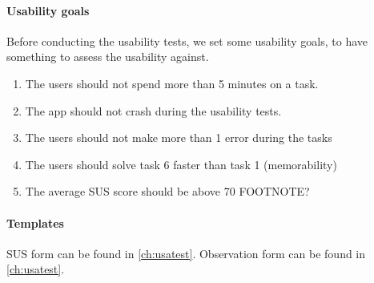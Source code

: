 		\paragraph{Usability goals}\hfill
\newline
		Before conducting the usability tests, we set some usability goals, to have something to assess the usability against.
		\begin{enumerate}
			\item{}The users should not spend more than 5 minutes on a task.
			\item{}The app should not crash during the usability tests.
			\item{}The users should not make more than 1 error during the tasks
			\item{}The users should solve task 6 faster than task 1 (memorability)
			\item{}The average SUS score should be above 70 FOOTNOTE?
		\end{enumerate}
		\paragraph{Templates}\hfill
\newline
			SUS form can be found in \ref{ch:usatest}.
			\newline\newline
			Observation form can be found in \ref{ch:usatest}.
